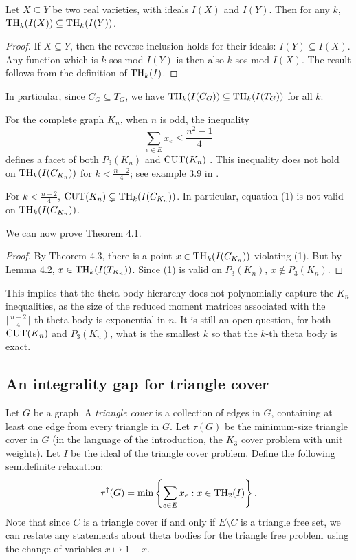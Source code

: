 \begin{lemma}\label{ideal_inclusion}
Let $X \subseteq Y$ be two real varieties, with ideals $I(X)$ and $I(Y)$. Then for any $k$, $\textup{TH}_k(I(X)) \subseteq \textup{TH}_k(I(Y))$.
\end{lemma}
\begin{proof}
If $X \subseteq Y$, then the reverse inclusion holds for their ideals: $I(Y) \subseteq I(X)$. Any function which is $k$-sos mod $I(Y)$ is then also $k$-sos mod $I(X)$. The result follows from the definition of $\textup{TH}_k(I)$.
\end{proof}
In particular, since $C_G \subseteq T_G$, we have $\textup{TH}_k(I(C_G)) \subseteq \textup{TH}_k(I(T_G))$ for all $k$.

For the complete graph $K_n$, when $n$ is odd, the inequality
\begin{equation} \sum_{e \in E} x_e \le \frac{n^2-1}{4}\end{equation}
defines a facet of both $P_3(K_n)$ and $\textup{CUT}(K_n)$ \cite{moniquestuff}. This inequality does not hold on $\textup{TH}_k(I(C_{K_n}))$ for $k < \frac{n-2}{4}$; see example 3.9 in \cite{GLPT}.
\begin{theorem}
For $k < \frac{n-2}{4}$, $\textup{CUT}(K_n) \subsetneq \textup{TH}_{k}(I(C_{K_n}))$. In particular, equation (1) is not valid on $\textup{TH}_{k}(I(C_{K_n}))$.
\end{theorem}

We can now prove Theorem 4.1.

\begin{proof}
By Theorem 4.3, there is a point $x \in \textup{TH}_{k}(I(C_{K_n}))$ violating (1). But by Lemma 4.2, $x \in \textup{TH}_{k}(I(T_{K_n}))$. Since (1) is valid on $P_3(K_n)$, $x \notin P_3(K_n)$.
\end{proof}

This implies that the theta body hierarchy does not polynomially capture the $K_n$ inequalities, as the size of the reduced moment matrices associated with the $\lceil\frac{n-2}{4}\rceil$-th theta body is exponential in $n$. It is still an open question, for both $\textup{CUT}(K_n)$ and $P_3(K_n)$, what is the
smallest $k$ so that the $k$-th theta body is exact.

\subsection{An integrality gap for triangle cover}
Let $G$ be a graph. A {\it triangle cover} is a collection of edges in $G$, containing at least one edge from every triangle in $G$. Let $\tau(G)$ be the minimum-size triangle cover in $G$ (in the language of the introduction, the $K_3$ cover problem with unit weights). Let $I$ be the ideal of the triangle cover problem. Define the following semidefinite relaxation:
$$\tau^\dagger(G) = \min \left\{\sum_{e \in E} x_e: x \in \textup{TH}_2(I) \right\}.$$
Note that since $C$ is a triangle cover if and only if $E \setminus C$ is a triangle free set, we can restate any statements about theta bodies for the triangle free problem using the change of variables $x \mapsto 1-x$.

